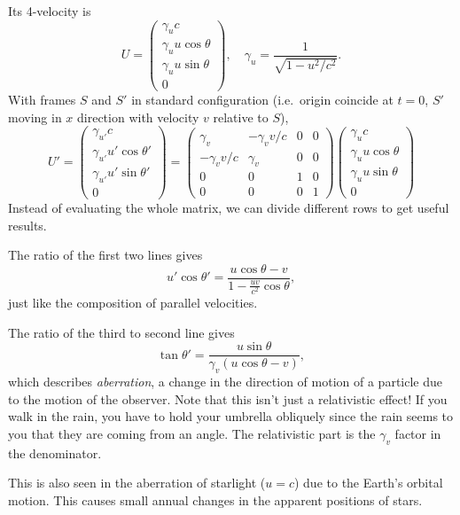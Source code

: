 \documentclass[a4paper]{article}
\begin{document}
Its 4-velocity is
\[
  U =
  \begin{pmatrix}
    \gamma_u c\\
    \gamma_u u\cos \theta\\
    \gamma_u u\sin \theta\\
    0
  \end{pmatrix}, \quad \gamma_u = \frac{1}{\sqrt{1 - u^2/c^2}}.
\]
With frames $S$ and $S'$ in standard configuration (i.e.\ origin coincide at $t = 0$, $S'$ moving in $x$ direction with velocity $v$ relative to $S$),
\[
  U' = \begin{pmatrix}
    \gamma_{u'} c\\
    \gamma_{u'} u'\cos \theta'\\
    \gamma_{u'} u'\sin \theta'\\
    0
  \end{pmatrix}
  =
  \begin{pmatrix}
    \gamma_v & -\gamma_v v/c & 0 & 0\\
    -\gamma_{v} v/c & \gamma_v & 0 & 0\\
    0 & 0 & 1 & 0\\
    0 & 0 & 0 & 1
  \end{pmatrix}
  \begin{pmatrix}
    \gamma_u c\\
    \gamma_u u\cos \theta\\
    \gamma_u u\sin \theta\\
    0
  \end{pmatrix}
\]
Instead of evaluating the whole matrix, we can divide different rows to get useful results.

The ratio of the first two lines gives
\[
  u'\cos \theta' = \frac{u\cos \theta - v}{1 - \frac{uv}{c^2}\cos \theta},
\]
just like the composition of parallel velocities.

The ratio of the third to second line gives
\[
  \tan \theta' = \frac{u\sin \theta}{\gamma_v(u\cos \theta - v)},
\]
which describes \emph{aberration}, a change in the direction of motion of a particle due to the motion of the observer. Note that this isn't just a relativistic effect! If you walk in the rain, you have to hold your umbrella obliquely since the rain seems to you that they are coming from an angle. The relativistic part is the $\gamma_v$ factor in the denominator.

This is also seen in the aberration of starlight ($u = c$) due to the Earth's orbital motion. This causes small annual changes in the apparent positions of stars.
\end{document}
